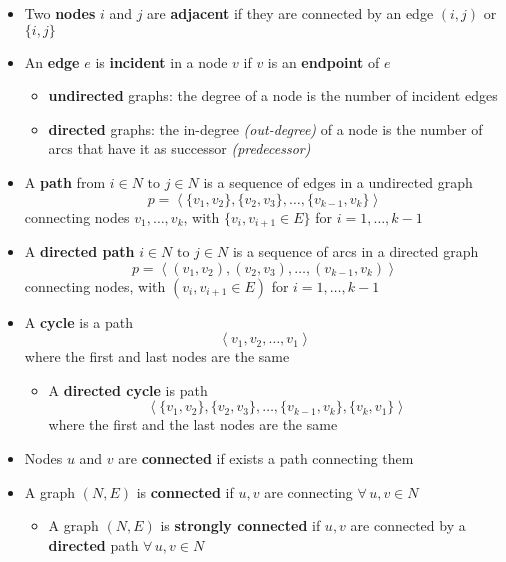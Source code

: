 \documentclass[english]{article}
\begin{document}
\begin{itemize}
  \item Two \textbf{nodes} \(i\) and \(j\) are \textbf{adjacent} if they are connected by an edge \((i, j)\) or \(\{i, j\}\)
  \item An \textbf{edge} \(e\) is \textbf{incident} in a node \(v\) if \(v\) is an \textbf{endpoint} of \(e\)
        \begin{itemize}
          \item \textbf{undirected} graphs: the degree of a node is the number of incident edges
          \item \textbf{directed} graphs: the in-degree \textit{(out-degree)} of a node is the number of arcs that have it as successor \textit{(predecessor)}
        \end{itemize}
  \item A \textbf{path} from \(i \in N \text{ to } j \in N\) is a sequence of edges in a undirected graph
        \[ p = \left\langle \{v_1, v_2\}, \{v_2, v_3\}, \ldots, \{v_{k-1}, v_k\}\right\rangle \]
        connecting nodes \(v_1, \ldots, v_k\), with \(\{v_i, v_{i+1} \in E\}\) for \(i = 1, \ldots, k-1\)
  \item A \textbf{directed path} \(i \in N \text{ to } j \in N\) is a sequence of arcs in a directed graph
        \[ p = \left\langle (v_1, v_2), (v_2, v_3), \ldots, (v_{k-1}, v_k)\right\rangle \]
        connecting nodes, with  \((v_i, v_{i+1} \in E)\)  for \(i = 1, \ldots, k-1\)
  \item A \textbf{cycle} is a path \[ \left\langle v_1, v_2, \ldots, v_1 \right\rangle \] where the first and last nodes are the same
        \begin{itemize}
          \item A \textbf{directed cycle} is path \[ \left\langle \{v_1, v_2\}, \{v_2, v_3\}, \ldots, \{v_{k-1}, v_k\}, \{v_k, v_1\}\right\rangle \]
                where the first and the last nodes are the same
        \end{itemize}
  \item Nodes \(u\) and \(v\) are \textbf{connected} if exists a path connecting them
  \item A graph \((N, E)\) is \textbf{connected} if \(u, v\) are connecting \(\forall \, u, v \in N\)
        \begin{itemize}
          \item A graph \((N, E)\) is \textbf{strongly connected} if \(u, v\) are connected by a \textbf{directed} path \(\forall \, u, v \in N\)
        \end{itemize}

\end{itemize}
\end{document}
